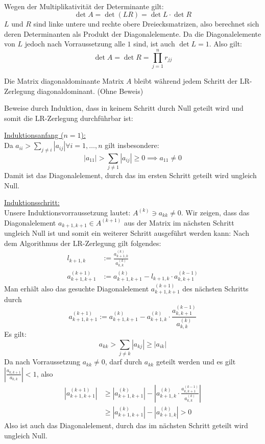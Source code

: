 \documentclass[a4paper]{scrartcl}
\begin{document}
\setcounter{aufgabe}{2}
\begin{aufgabe}\\
	Wegen der Multiplikativität der Determinante gilt:
	\[
		\det A = \det (LR) = \det L \cdot \det R
	\]
	$L$ und $R$ sind linke untere und rechte obere Dreiecksmatrizen, also berechnet sich deren Determinanten als Produkt der Diagonalelemente.
	Da die Diagonalelemente von $L$ jedoch nach Vorraussetzung alle $1$ sind, ist auch $\det L=1$.
	Also gilt:
	\[
		\det A = \det R = \prod_{j=1}^nr_{jj}
	\]
\end{aufgabe}
\newpage
\begin{aufgabe}
	\begin{lem*}
		Die Matrix diagonaldominante Matrix $A$ bleibt während jedem Schritt der LR-Zerlegung diagonaldominant.
		(Ohne Beweis)
	\end{lem*}\vspace{1em}

	Beweise durch Induktion, dass in keinem Schritt durch Null geteilt wird und somit die LR-Zerlegung durchführbar ist:
	
	\underline{Induktionsanfang ($n=1$):}\\
	Da $a_{ii}>\sum_{j\neq i}|a_{ij}| \forall i=1,\dotsc,n$ gilt insbesondere:
	\[
		|a_{11}|>\sum_{j\neq 1}|a_{ij}| \ge 0 \implies a_{11} \neq 0
	\]
	Damit ist das Diagonalelement, durch das im ersten Schritt geteilt wird ungleich Null.
	
	\underline{Induktionsschritt:}\\
	Unsere Induktionsvorraussetzung lautet: $A^{(k)}\ni a_{kk}\neq 0$.
	Wir zeigen, dass das Diagonalelement $a_{k+1,k+1}\in A^{(k+1)}$ aus der Matrix im nächsten Schritt ungleich Null ist und somit ein weiterer Schritt ausgeführt werden kann:
	Nach dem Algorithmus der LR-Zerlegung gilt folgendes:
	\begin{align*}
		l_{k+1,k} &:= \frac {a_{k+1,k}^{(k)}}{a_{k,k}^{(k)}}\\
		a_{k+1,k+1}^{(k+1)} &:= a_{k+1,k+1}^{(k)} - l_{k+1,k}\cdot a_{k,k+1}^{(k-1)}
	\end{align*}
	Man erhält also das gesuchte Diagonalelement $a_{k+1,k+1}^{(k+1)}$ des nächsten Schritts durch 
	\[
		a_{k+1,k+1}^{(k+1)} := a_{k+1,k+1}^{(k)} - a_{k+1,k}^{(k)}\cdot \frac{ a_{k,k+1}^{(k-1)}}{a_{k,k}^{(k)}}
	\]
	Es gilt:
	\[
		a_{kk} > \sum_{j\neq k}|a_{kj}| \ge |a_{ik}|
	\]
	Da nach Vorraussetzung $a_{kk}\neq 0$, darf durch $a_{kk}$ geteilt werden und es gilt $\left|\frac{a_{k,k+1}}{a_{k,k}}\right|<1$, also
	\begin{align*}
		\left|a_{k+1,k+1}^{(k+1)}\right| &\ge \left|a_{k+1,k+1}^{(k)}\right| - \left|a_{k+1,k}^{(k)}\cdot \frac{ a_{k,k+1}^{(k-1)}}{a_{k,k}^{(k)}}\right|\\
																										&\ge \left|a_{k+1,k+1}^{(k)}\right| - \left|a_{k+1,k}^{(k)}\right| > 0
	\end{align*}
	Also ist auch das Diagonalelement, durch das im nächsten Schritt geteilt wird ungleich Null.
\end{aufgabe}
\end{document}
